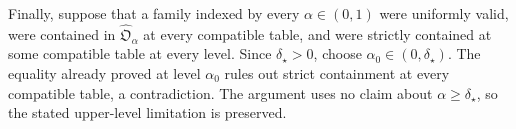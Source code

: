 Finally, suppose that a family indexed by every \(\alpha\in(0,1)\) were uniformly valid, were contained in \(\widehat{\mathfrak O}_\alpha\) at every compatible table, and were strictly contained at some compatible table at every level. Since \(\delta_\star>0\), choose \(\alpha_0\in(0,\delta_\star)\). The equality already proved at level \(\alpha_0\) rules out strict containment at every compatible table, a contradiction. The argument uses no claim about \(\alpha\ge\delta_\star\), so the stated upper-level limitation is preserved.

